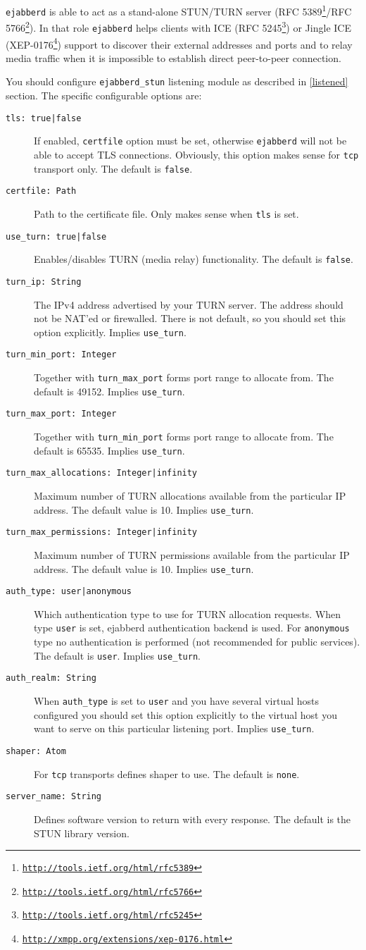 \documentclass[a4paper,10pt]{book}
\newcommand{\bracehack}{\def\{{\char"7B}\def\}{\char"7D}}
\newcommand{\titem}[1]{\item[\bracehack\texttt{#1}]}
\newcommand{\option}[1]{\texttt{#1}}
\newcommand{\term}[1]{\texttt{#1}}
\newcommand{\ejabberd}{\texttt{ejabberd}}
\gdef\footahref#1#2{#2\footnote{\href{#1}{\texttt{#1}}}}
\newcommand{\txepref}[2]{\footahref{http://xmpp.org/extensions/xep-#1.html}{#2}}
\newcommand{\xepref}[1]{\txepref{#1}{XEP-#1}}
\begin{document}
\ejabberd{} is able to act as a stand-alone STUN/TURN server
(\footahref{http://tools.ietf.org/html/rfc5389}{RFC 5389}/\footahref{http://tools.ietf.org/html/rfc5766}{RFC 5766}). In that role \ejabberd{} helps clients with ICE (\footahref{http://tools.ietf.org/html/rfc5245}{RFC 5245}) or Jingle ICE (\xepref{0176}) support to discover their external addresses and ports and to relay media traffic when it is impossible to establish direct
peer-to-peer connection.

You should configure \term{ejabberd\_stun} listening module as described in \ref{listened} section.
The specific configurable options are:
\begin{description}
  \titem{tls: true|false}
  If enabled, \option{certfile} option must be set, otherwise \ejabberd{}
  will not be able to accept TLS connections. Obviously, this option
  makes sense for \term{tcp} transport only. The default is \term{false}.
  \titem{certfile: Path}
  Path to the certificate file. Only makes sense when \option{tls} is set.
  \titem{use\_turn: true|false}
  Enables/disables TURN (media relay) functionality. The default is \term{false}.
  \titem{turn\_ip: String}
  The IPv4 address advertised by your TURN server. The address should not be NAT'ed
  or firewalled. There is not default, so you should set this option explicitly.
  Implies \term{use\_turn}.
  \titem{turn\_min\_port: Integer}
  Together with \option{turn\_max\_port} forms port range to allocate from.
  The default is 49152. Implies \term{use\_turn}.
  \titem{turn\_max\_port: Integer}
  Together with \option{turn\_min\_port} forms port range to allocate from.
  The default is 65535. Implies \term{use\_turn}.
  \titem{turn\_max\_allocations: Integer|infinity}
  Maximum number of TURN allocations available from the particular IP address.
  The default value is 10. Implies \term{use\_turn}.
  \titem{turn\_max\_permissions: Integer|infinity}
  Maximum number of TURN permissions available from the particular IP address.
  The default value is 10. Implies \term{use\_turn}.
  \titem{auth\_type: user|anonymous}
  Which authentication type to use for TURN allocation requests. When type \term{user}
  is set, ejabberd authentication backend is used. For \term{anonymous} type
  no authentication is performed (not recommended for public services).
  The default is \term{user}. Implies \term{use\_turn}.
  \titem{auth\_realm: String}
  When \option{auth\_type} is set to \term{user} and you have several virtual
  hosts configured you should set this option explicitly to the virtual host
  you want to serve on this particular listening port. Implies \term{use\_turn}.
  \titem{shaper: Atom}
  For \term{tcp} transports defines shaper to use. The default is \term{none}.
  \titem{server\_name: String}
  Defines software version to return with every response. The default is the
  STUN library version.
\end{description}
\end{document}
